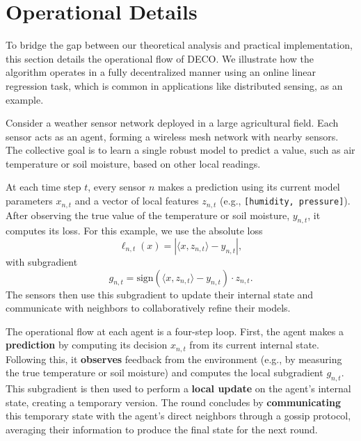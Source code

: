 \documentclass[journal]{IEEEtran} %
\newcommand{\algname}{{DECO}\xspace}
\begin{document}
\section{Operational Details}\label{sec:operational-details}
To bridge the gap between our theoretical analysis and practical implementation, this section details the operational flow of \algname{}.
We illustrate how the algorithm operates in a fully decentralized manner using an online linear regression task, which is common in applications like distributed sensing, as an example.

Consider a weather sensor network deployed in a large agricultural field.
Each sensor acts as an agent, forming a wireless mesh network with nearby sensors.
The collective goal is to learn a single robust model to predict a value, such as air temperature or soil moisture, based on other local readings.

At each time step $t$, every sensor $n$ makes a prediction using its current model parameters $x_{n,t}$ and a vector of local features $z_{n,t}$ (e.g., \texttt{[humidity, pressure]}).
After observing the true value of the temperature or soil moisture, $y_{n,t}$, it computes its loss.
For this example, we use the absolute loss
\begin{equation}
    \ell_{n,t}(x) = | \langle x, z_{n,t} \rangle - y_{n,t} |,\label{eq:absolute_loss}
\end{equation}
with subgradient
\begin{equation}
    g_{n,t} = \text{sign}(\langle x, z_{n,t} \rangle - y_{n,t}) \cdot z_{n,t}.\label{eq:absolute_subgradient}
\end{equation}
The sensors then use this subgradient to update their internal state and communicate with neighbors to collaboratively refine their models.

The operational flow at each agent is a four-step loop.
First, the agent makes a \textbf{prediction} by computing its decision $x_{n,t}$ from its current internal state.
Following this, it \textbf{observes} feedback from the environment (e.g., by measuring the true temperature or soil moisture) and computes the local subgradient $g_{n,t}$.
This subgradient is then used to perform a \textbf{local update} on the agent's internal state, creating a temporary version.
The round concludes by \textbf{communicating} this temporary state with the agent's direct neighbors through a gossip protocol, averaging their information to produce the final state for the next round.
\end{document}
